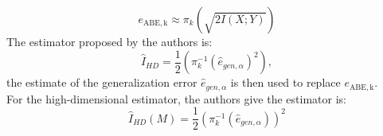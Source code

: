 \begin{equation}
    e_{\mathrm {ABE,k} } \approx  \pi _{k}\left ( \sqrt{2I(X;Y)} \right ) 
\end{equation}
The estimator proposed by the authors is:
\begin{equation}
    \hat{I} _{HD} = \frac{1}{2}(\pi _{k}^{-1}(\hat{e}_{gen,\alpha })^{2}  )  ,
\end{equation}
the estimate of the generalization error $\hat{e}_{gen,\alpha }$ is then used to replace $e_{\mathrm {ABE,k} }$.\\
For the high-dimensional estimator, the authors give the estimator is:
\begin{equation}
    \hat{I}_{HD}(M) = \frac{1}{2}(\pi _{k}^{-1}(\hat{e}_{gen,\alpha }  )  )^{2}  
\end{equation}

